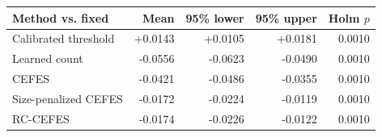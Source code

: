 \begin{tabular}{lrrrr}
\toprule
Method vs. fixed & Mean & 95\% lower & 95\% upper & Holm $p$ \\
\midrule
Calibrated threshold & +0.0143 & +0.0105 & +0.0181 & 0.0010 \\
Learned count & -0.0556 & -0.0623 & -0.0490 & 0.0010 \\
CEFES & -0.0421 & -0.0486 & -0.0355 & 0.0010 \\
Size-penalized CEFES & -0.0172 & -0.0224 & -0.0119 & 0.0010 \\
RC-CEFES & -0.0174 & -0.0226 & -0.0122 & 0.0010 \\
\bottomrule
\end{tabular}
